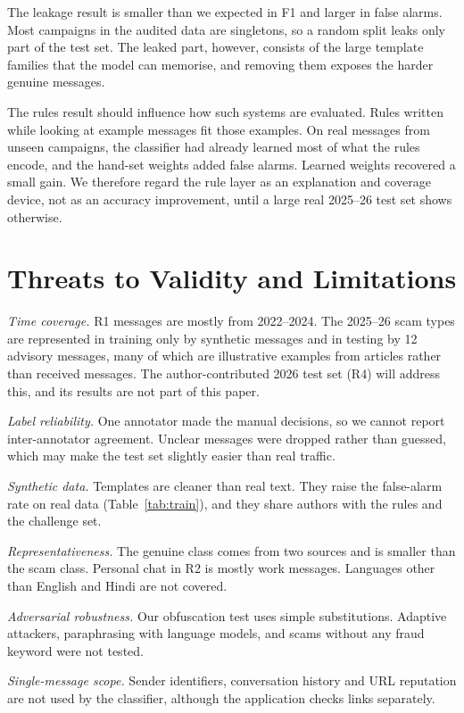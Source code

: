 \documentclass[conference]{IEEEtran}
\begin{document}
The leakage result is smaller than we expected in F1 and larger in false alarms. Most campaigns in the audited data are singletons, so a random split leaks only part of the test set. The leaked part, however, consists of the large template families that the model can memorise, and removing them exposes the harder genuine messages.

The rules result should influence how such systems are evaluated. Rules written while looking at example messages fit those examples. On real messages from unseen campaigns, the classifier had already learned most of what the rules encode, and the hand-set weights added false alarms. Learned weights recovered a small gain. We therefore regard the rule layer as an explanation and coverage device, not as an accuracy improvement, until a large real 2025--26 test set shows otherwise.

\section{Threats to Validity and Limitations}
\label{sec:limits}

\textit{Time coverage.} R1 messages are mostly from 2022--2024. The 2025--26 scam types are represented in training only by synthetic messages and in testing by 12 advisory messages, many of which are illustrative examples from articles rather than received messages. The author-contributed 2026 test set (R4) will address this, and its results are not part of this paper.

\textit{Label reliability.} One annotator made the manual decisions, so we cannot report inter-annotator agreement. Unclear messages were dropped rather than guessed, which may make the test set slightly easier than real traffic.

\textit{Synthetic data.} Templates are cleaner than real text. They raise the false-alarm rate on real data (Table~\ref{tab:train}), and they share authors with the rules and the challenge set.

\textit{Representativeness.} The genuine class comes from two sources and is smaller than the scam class. Personal chat in R2 is mostly work messages. Languages other than English and Hindi are not covered.

\textit{Adversarial robustness.} Our obfuscation test uses simple substitutions. Adaptive attackers, paraphrasing with language models, and scams without any fraud keyword were not tested.

\textit{Single-message scope.} Sender identifiers, conversation history and URL reputation are not used by the classifier, although the application checks links separately.
\end{document}
